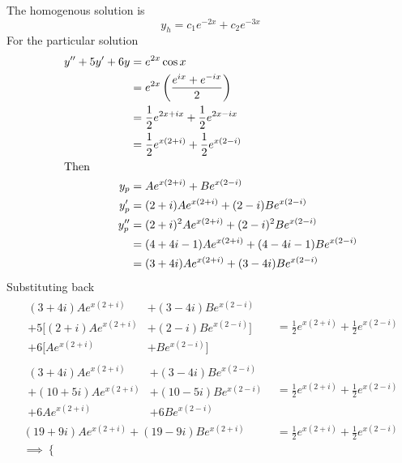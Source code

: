 \documentclass{zc-ust-hw}
\begin{document}
\begin{enumerate}
\begin{enumerate}
\begin{sol}
              The homogenous solution is
              \begin{equation}
                \boxed{y_{h}=c_{1}e^{-2x}+c_{2}e^{-3x}}
              \end{equation}
              For the particular solution
              \begin{align}
                y''+5y'+6y&=e^{2x}\cos x \\
                &=e^{2x}\left( \frac{e^{ix}+e^{-ix}}{2} \right) \\
                &=\frac{1}{2}e^{2x+ix}+\frac{1}{2}e^{2x-ix} \\
                &=\frac{1}{2}e^{x(2+i)}+\frac{1}{2}e^{x(2-i)} \\
                \intertext{Then}
                y_{p}&=Ae^{x(2+i)}+Be^{x(2-i)} \\
                y_{p}'&=(2+i)Ae^{x(2+i)}+(2-i)Be^{x(2-i)} \\
                y_{p}''&=(2+i)^2Ae^{x(2+i)}+(2-i)^2Be^{x(2-i)} \\
                &=(4+4i-1)Ae^{x(2+i)}+(4-4i-1)Be^{x(2-i)} \\
                &=(3+4i)Ae^{x(2+i)}+(3-4i)Be^{x(2-i)}
              \end{align}
              Substituting back
              \begin{align}
                \begin{array}{rl}
                  (3+4i)Ae^{x(2+i)}&+(3-4i)Be^{x(2-i)} \\
                  +5\big[(2+i)Ae^{x(2+i)}&+(2-i)Be^{x(2-i)} \big] \\
                  +6\big[Ae^{x(2+i)}&+Be^{x(2-i)}\big]
                \end{array}
                &=\frac{1}{2}e^{x(2+i)}+\frac{1}{2}e^{x(2-i)} \\
                \begin{array}{rl}
                  (3+4i)Ae^{x(2+i)}&+(3-4i)Be^{x(2-i)} \\
                  +(10+5i)Ae^{x(2+i)}&+(10-5i)Be^{x(2-i)} \\
                  +6Ae^{x(2+i)}&+6Be^{x(2-i)}
                \end{array}
                &=\frac{1}{2}e^{x(2+i)}+\frac{1}{2}e^{x(2-i)} \\
                (19+9i)Ae^{x(2+i)}+(19-9i)Be^{x(2+i)}&=\frac{1}{2}e^{x(2+i)}+\frac{1}{2}e^{x(2-i)} \\
                \implies\begin{cases}

\end{cases}
\end{align}
\end{sol}
\end{enumerate}
\end{enumerate}
\end{document}
